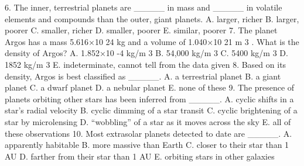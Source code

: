 6. The inner, terrestrial planets are _____ in mass and _____ in volatile elements and
compounds than the outer, giant planets.
A. larger, richer
B. larger, poorer
C. smaller, richer
D. smaller, poorer
E. similar, poorer
7. The planet Argos has a mass 5.616×10 24 kg and a volume of 1.040×10 21 m 3 . What is
the density of Argos?
A. 1.852×10 -4 kg/m 3
B. 54,000 kg/m 3
C. 5400 kg/m 3
D. 1852 kg/m 3
E. indeterminate, cannot tell from the data given
8. Based on its density, Argos is best classified as _____.
A. a terrestrial planet
B. a giant planet
C. a dwarf planet
D. a nebular planet
E. none of these
9. The presence of planets orbiting other stars has been inferred from _____.
A. cyclic shifts in a star’s radial velocity
B. cyclic dimming of a star transit
C. cyclic brightening of a star by microlensing
D. “wobbling” of a star as it moves across the sky
E. all of these observations
10. Most extrasolar planets detected to date are _____.
A. apparently habitable
B. more massive than Earth
C. closer to their star than 1 AU
D. farther from their star than 1 AU
E. orbiting stars in other galaxies



\endinput



